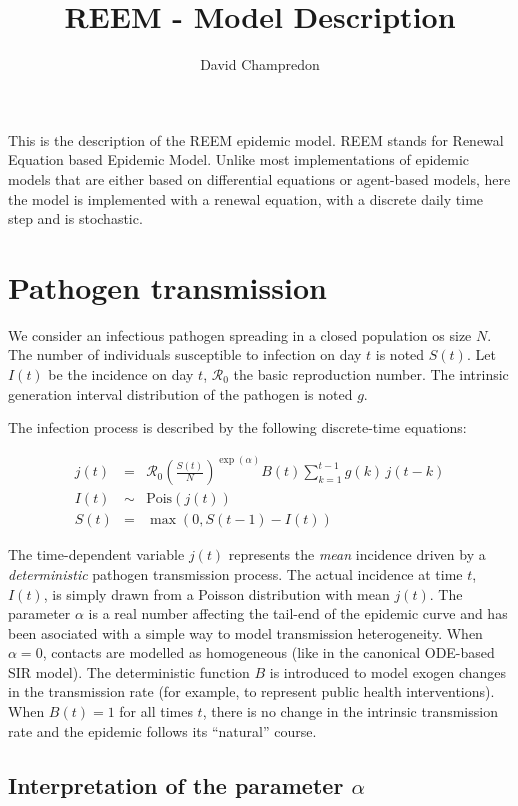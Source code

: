\documentclass[11pt]{article} %
\title{\textsf{REEM - Model Description}}
\author{David Champredon}
\newcommand{\Ro}{\ensuremath{\mathcal{R}_0}\xspace}
\begin{document}
\maketitle


This is the description of the REEM epidemic model. REEM stands for Renewal Equation based Epidemic Model. Unlike most implementations of epidemic models that are either based on differential equations or agent-based models, here the model is implemented with a renewal equation, with a discrete daily time step and is stochastic.

\section{Pathogen transmission}

We consider an infectious pathogen spreading in a closed population os size $N$. The number of individuals susceptible to infection on day $t$ is noted $S(t)$. 
Let $I(t)$ be the incidence on day $t$, \Ro the basic reproduction number.
The intrinsic generation interval distribution of the pathogen is noted $g$. 

The infection process is described by the following discrete-time equations:

\begin{eqnarray}
\label{eq:reinc}
j(t) & = & \Ro \left(\frac{S(t)}{N}\right)^{\exp(\alpha)} B(t) \sum_{k=1}^{t-1} g(k)\, j(t-k) \\ 
I(t) & \sim & \mathrm{Pois}(j(t))   \\
S(t) & = & \max(0, S(t-1) - I(t))
\end{eqnarray}

The time-dependent variable $j(t)$ represents the \emph{mean} incidence driven by a \emph{deterministic} pathogen transmission process.
The actual incidence at time $t$, $I(t)$, is simply drawn from a Poisson distribution with mean $j(t)$.
The parameter $\alpha$ is a real number affecting the tail-end of the epidemic curve and has been asociated with a simple way to model transmission heterogeneity. When $\alpha=0$, contacts are modelled as homogeneous (like in the canonical ODE-based SIR model). 
The deterministic function $B$ is introduced to model exogen changes in the transmission rate (for example, to represent public health interventions). When $B(t) = 1$ for all times $t$, there is no change in the intrinsic transmission rate and the epidemic follows its ``natural'' course. 

\subsection{Interpretation of the parameter $\alpha$}
\end{document}
